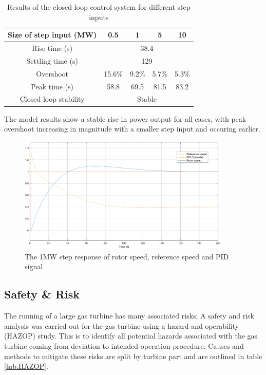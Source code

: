  \begin {table} [h]
\begin{center}
\caption{Results of the closed loop control system for different step inputs} \label{tab:controlresults} 
\begin{tabular}{ |c|c|c|c|c|}
 \hline
 Size of step input (MW) & 0.5 & 1 & 5 & 10\\
 \hline
  Rise time (s) & \multicolumn{4}{|c|}{38.4}\\ 
 \hline
  Settling time (s) & \multicolumn{4}{|c|}{129}\\ 
  \hline
  Overshoot & 15.6\% & 9.2\% & 5.7\% & 5.3\%\\ 
  \hline
  Peak time (s) & 58.8 & 69.5 & 81.5 & 83.2 \\
 \hline
 Closed loop stability & \multicolumn{4}{|c|}{Stable}\\
 \hline
\end{tabular}
\end{center}  
\end {table}

The model results show a stable rise in power output for all cases, with peak overshoot increasing in magnitude with a smaller step input and occuring earlier.


\begin{figure} [h]
\centering
\includegraphics[width=0.9\textwidth]{./pictures/scope.eps}
  \caption{The 1MW step response of rotor speed, reference speed and PID signal} \label{fig:scope}
  \end{figure}

\subsection{Safety \& Risk}
The running of a large gas turbine has many associated risks; A safety and risk analysis was carried out for the gas turbine using a hazard and operability (HAZOP) study. This is to identify all potential hazards associated with the gas turbine coming from deviation to intended operation procedure. Causes and methods to mitigate these risks are split by turbine part and are outlined in table \ref{tab:HAZOP}.

